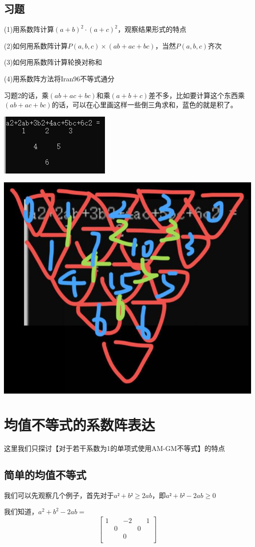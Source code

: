 \documentclass[UTF8]{ctexart}
\begin{document}
\subsection{习题}

(1)用系数阵计算$ (a+b)^{2}·(a+c)^{2} $，观察结果形式的特点

(2)如何用系数阵计算$ P(a,b,c)×(ab+ac+bc) $，当然$ P(a,b,c) $齐次

(3)如何用系数阵计算轮换对称和

(4)用系数阵方法将Iran96不等式通分

习题2的话，乘$ (ab+ac+bc) $和乘$ (a+b+c) $差不多，比如要计算这个东西乘$ (ab+ac+bc) $的话，可以在心里画这样一些倒三角求和，蓝色的就是积了。
\begin{center}
	\includegraphics[width=0.35\linewidth]{100}
\end{center}
\begin{center}
	\includegraphics[width=0.35\linewidth]{110}
\end{center}
\section{均值不等式的系数阵表达}
这里我们只探讨【对于若干系数为1的单项式使用AM-GM不等式】的特点

\subsection{简单的均值不等式}
我们可以先观察几个例子，首先对于$ a²+b²\geq2ab $，即$ a²+b²-2ab\geq0 $

我们知道，$ a^{2}+b^{2}-2ab= $
\renewcommand*{\arraystretch}{1.732}\[\left[\begin{matrix}
	1& & -2& &1 \\
	& 0& &0 & \\
	& & 0& & \\
\end{matrix}\right]\]
\end{document}
